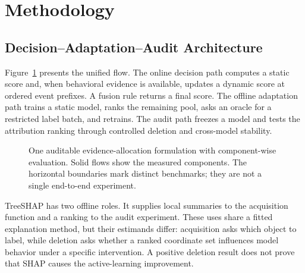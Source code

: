 \section{Methodology}
\label{sec:method}

\subsection{Decision--Adaptation--Audit Architecture}

Figure~\ref{fig:architecture} presents the unified flow. The online decision path
computes a static score and, when behavioral evidence is available, updates a
dynamic score at ordered event prefixes. A fusion rule returns a final score.
The offline adaptation path trains a static model, ranks the remaining pool, asks
an oracle for a restricted label batch, and retrains. The audit path freezes a
model and tests the attribution ranking through controlled deletion and
cross-model stability.

\begin{figure}[t]
\centering
{}
\caption{One auditable evidence-allocation formulation with component-wise
evaluation. Solid flows show the measured components. The horizontal boundaries
mark distinct benchmarks; they are not a single end-to-end experiment.}
\label{fig:architecture}
\end{figure}

TreeSHAP has two offline roles. It supplies local summaries to the acquisition
function and a ranking to the audit experiment. These uses share a fitted
explanation method, but their estimands differ: acquisition asks which object to
label, while deletion asks whether a ranked coordinate set influences model
behavior under a specific intervention. A positive deletion result does not
prove that SHAP causes the active-learning improvement.


